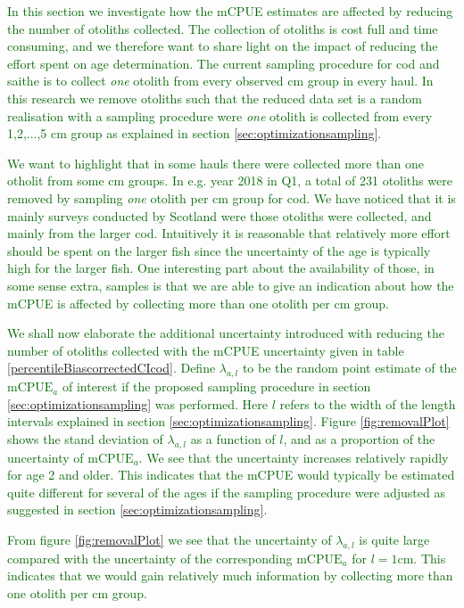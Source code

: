 \documentclass[a4paper 12pt]{article}
\numberwithin{equation}{section}
\newcommand{\olav}[1]{\textcolor{darkgreen}{#1}}
\begin{document}
{\olav{In this section we investigate how the mCPUE estimates are affected by reducing the number of otoliths collected. The collection of otoliths is cost full and time consuming, and we therefore want to share light on the impact of reducing the effort spent on age determination. The current sampling procedure for cod and saithe is to collect \textit{one} otolith from every observed cm group in every haul. In this research we remove otoliths such that the reduced data set is a random realisation with a sampling procedure were \textit{one} otolith is collected from every 1,2,...,5 cm group as explained in section \ref{sec:optimizationsampling}. }

\olav{We want to highlight that in some hauls there were collected more than one otholit from some cm groups. In e.g. year 2018 in Q1, a total of 231 otoliths were removed by sampling \textit{one} otolith per cm group for cod. We have noticed that it is mainly surveys conducted by Scotland were those otoliths were collected, and mainly from the larger cod. Intuitively it is reasonable that relatively more effort should be spent on the larger fish since the uncertainty of the age is typically high for the larger fish. One interesting part about the availability of those, in some sense extra, samples is that we are able to give an indication about how the mCPUE is affected by collecting more than one otolith per cm group.}

\olav{We shall now elaborate the additional uncertainty introduced with reducing the number of otoliths collected with the mCPUE uncertainty given in table \ref{percentileBiascorrectedCIcod}. Define $\lambda_{a,l}$ to be the random point estimate of the $\text{mCPUE}_a$ of interest if the proposed sampling procedure in section \ref{sec:optimizationsampling} was performed. Here $l$ refers to the width of the length intervals explained in section \ref{sec:optimizationsampling}.  Figure \ref{fig:removalPlot} shows the stand deviation of $\lambda_{a,l}$ as a function of $l$, and as a proportion of the uncertainty of $\text{mCPUE}_a$. We see that the uncertainty increases relatively rapidly for age 2 and older. This indicates that the mCPUE would typically be estimated quite different for several of the ages if the sampling procedure were adjusted as suggested in section \ref{sec:optimizationsampling}.}

\olav{From figure \ref{fig:removalPlot} we see that the uncertainty of $\lambda_{a,l}$ is quite large compared with the uncertainty of the corresponding $\text{mCPUE}_a$ for $l = 1$cm. This indicates that we would gain relatively much information by collecting more than one otolith per cm group.}


}
\end{document}
